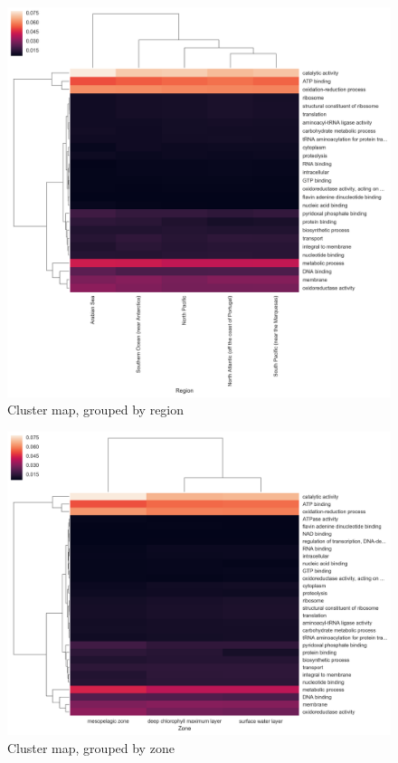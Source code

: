 \documentclass[12pt,a4paper,]{article}
\begin{document}
\begin{figure}
\centering
\includegraphics{imgs/cluster/cluster_region.png}
\caption{Cluster map, grouped by region\label{fig:cluster_region}}
\end{figure}

\begin{figure}
\centering
\includegraphics{imgs/cluster/cluster_zone.png}
\caption{Cluster map, grouped by zone\label{fig:cluster_zone}}
\end{figure}
\end{document}
